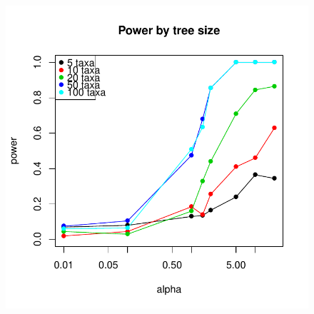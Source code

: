 \documentclass{elsarticle}
\makeatletter
\newenvironment{kframe}{%
 \def\FrameCommand##1{\hskip\@totalleftmargin \hskip-\fboxsep
 \colorbox{shadecolor}{##1}\hskip-\fboxsep
     \hskip-\linewidth \hskip-\@totalleftmargin \hskip\columnwidth}%
 \MakeFramed {\advance\hsize-\width
   \@totalleftmargin\z@ \linewidth\hsize
   \@setminipage}}%
 {\par\unskip\endMakeFramed}
\newenvironment{knitrout}{}{} %
\makeatother
\begin{document}
\begin{figure}
\begin{center}
\begin{knitrout}
{\begin{kframe}
\centering{}\includegraphics{Fig6a} 

\end{kframe}}
\end{knitrout}

\end{center}
\caption{}
\label{fig:sixa}
\end{figure}
\end{document}
